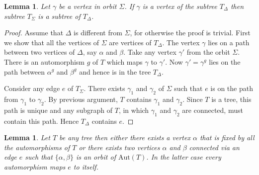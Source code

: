 \documentclass[a4paper,11pt]{article}
\newtheorem{lemma}[theorem]{Lemma}
\newcommand{\Aut}[1]{\ensuremath{\mathrm{Aut}\left(#1\right)}}
\begin{document}
\begin{lemma}\label{lem-subtree}
  Let $\gamma$ be a vertex in orbit $\Sigma$. If $\gamma$ is a vertex
  of the subtree $T_{\Delta}$ then subtree $T_{\Sigma}$ is a subtree
  of $T_{\Delta}$.
\end{lemma}
\begin{proof}
  Assume that $\Delta$ is different from $\Sigma$, for otherwise the
  proof is trivial. First we show that all the vertices of $\Sigma$
  are vertices of $T_\Delta$. The vertex $\gamma$ lies on a path
  between two vertices of $\Delta$, say $\alpha$ and $\beta$. Take any
  vertex $\gamma'$ from the orbit $\Sigma$. There is an automorphism
  $g$ of $T$ which maps $\gamma$ to $\gamma'$. Now $\gamma'=\gamma^g$
  lies on the path between $\alpha^g$ and $\beta^g$ and hence is in
  the tree $T_\Delta$.

  Consider any edge $e$ of $T_\Sigma$. There exists $\gamma_1$ and
  $\gamma_2$ of $\Sigma$ such that $e$ is on the path from $\gamma_1$
  to $\gamma_2$. By previous argument, $T$ contains $\gamma_1$ and
  $\gamma_2$. Since $T$ is a tree, this path is unique and any
  subgraph of $T$, in which $\gamma_1$ and $\gamma_2$ are connected,
  must contain this path. Hence $T_{\Delta}$ contains $e$.
\end{proof}

\begin{lemma}\label{lem-edge}
  Let $T$ be any tree then either there exists a vertex $\alpha$ that
  is fixed by all the automorphisms of $T$ or there exists two
  vertices $\alpha$ and $\beta$ connected via an edge $e$ such that
  $\{ \alpha,\beta\}$ is an orbit of $\Aut{T}$. In the latter case
  every automorphism maps $e$ to itself.
\end{lemma}

\end{document}
